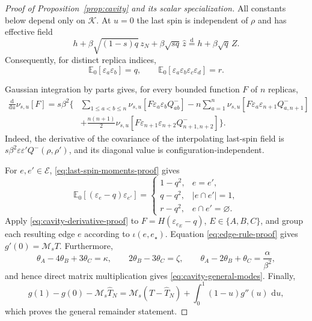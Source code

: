 \documentclass[11pt]{article}
\numberwithin{equation}{section}
\newcommand{\1}{\mathbf 1}
\newcommand{\cK}{\mathcal K}
\newcommand{\dd}{\,\mathrm d}
\begin{document}
\begin{proof}[Proof of Proposition~\ref{prop:cavity} and its scalar specialization]
All constants below depend only on $\cK$.  At $u=0$ the last spin is
independent of $\rho$ and has effective field
\[
 h+\beta\sqrt{(1-s)q}\,z_N+\beta\sqrt{sq}\,\widehat z
 \stackrel{\mathrm d}=h+\beta\sqrt q\,Z.
\]
Consequently, for distinct replica indices,
\begin{equation}
 \mathbb E_0[\varepsilon_a\varepsilon_b]=q,\qquad
 \mathbb E_0[\varepsilon_a\varepsilon_b\varepsilon_c\varepsilon_d]=r.
 \label{eq:last-spin-moments-proof}
\end{equation}

Gaussian integration by parts gives, for every bounded function $F$ of
$n$ replicas,
\begin{align}
 \frac{\mathrm d}{\mathrm du}\nu_{s,u}[F]
 =s\beta^2\Bigg\{&
 \sum_{1\le a<b\le n}
 \nu_{s,u}[F\varepsilon_a\varepsilon_bQ^-_{ab}]
 -n\sum_{a=1}^n
 \nu_{s,u}[F\varepsilon_a\varepsilon_{n+1}Q^-_{a,n+1}]
 \nonumber\\
 &+\frac{n(n+1)}2
 \nu_{s,u}[F\varepsilon_{n+1}\varepsilon_{n+2}
 Q^-_{n+1,n+2}]
 \Bigg\}.
 \label{eq:cavity-derivative-proof}
\end{align}
Indeed, the derivative of the covariance of the interpolating last-spin
field is $s\beta^2\varepsilon\varepsilon'Q^-(\rho,\rho')$, and its
diagonal value is configuration-independent.

For $e,e'\in\mathcal E$, \eqref{eq:last-spin-moments-proof} gives
\begin{equation}
 \mathbb E_0[(\varepsilon_e-q)\varepsilon_{e'}]
 =
 \begin{cases}
 1-q^2,&e=e',\\
 q-q^2,&|e\cap e'|=1,\\
 r-q^2,&e\cap e'=\varnothing.
 \end{cases}
 \label{eq:edge-rule-proof}
\end{equation}
Apply \eqref{eq:cavity-derivative-proof} to
$F=H(\varepsilon_{e_E}-q)$, $E\in\{A,B,C\}$, and group each resulting
edge $e$ according to $\iota(e,e_\star)$.  Equation
\eqref{eq:edge-rule-proof} gives $g'(0)=\mathcal M_sT$.  Furthermore,
\[
 \theta_A-4\theta_B+3\theta_C=\kappa,\qquad
 2\theta_B-3\theta_C=\zeta,\qquad
 \theta_A-2\theta_B+\theta_C=\frac{\alpha}{\beta^2},
\]
and hence direct matrix multiplication gives
\eqref{eq:cavity-general-modes}.  Finally,
\[
 g(1)-g(0)-\mathcal M_s\widehat T_N
 =\mathcal M_s(T-\widehat T_N)
 +\int_0^1(1-u)g''(u)\,\dd u,
\]
which proves the general remainder statement.


\end{proof}
\end{document}
